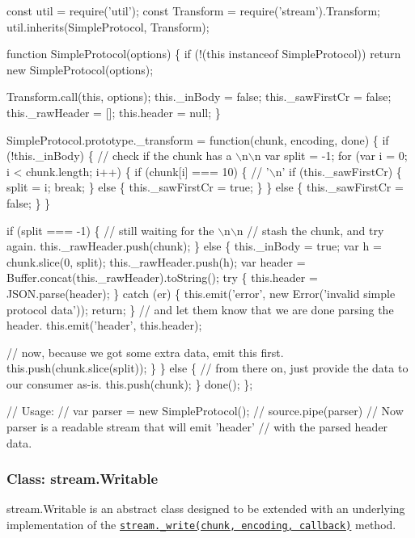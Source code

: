 \begin{DoxyCode}
const util = require('util');
const Transform = require('stream').Transform;
util.inherits(SimpleProtocol, Transform);

function SimpleProtocol(options) \{
  if (!(this instanceof SimpleProtocol))
    return new SimpleProtocol(options);

  Transform.call(this, options);
  this.\_inBody = false;
  this.\_sawFirstCr = false;
  this.\_rawHeader = [];
  this.header = null;
\}

SimpleProtocol.prototype.\_transform = function(chunk, encoding, done) \{
  if (!this.\_inBody) \{
    // check if the chunk has a \(\backslash\)n\(\backslash\)n
    var split = -1;
    for (var i = 0; i < chunk.length; i++) \{
      if (chunk[i] === 10) \{ // '\(\backslash\)n'
        if (this.\_sawFirstCr) \{
          split = i;
          break;
        \} else \{
          this.\_sawFirstCr = true;
        \}
      \} else \{
        this.\_sawFirstCr = false;
      \}
    \}

    if (split === -1) \{
      // still waiting for the \(\backslash\)n\(\backslash\)n
      // stash the chunk, and try again.
      this.\_rawHeader.push(chunk);
    \} else \{
      this.\_inBody = true;
      var h = chunk.slice(0, split);
      this.\_rawHeader.push(h);
      var header = Buffer.concat(this.\_rawHeader).toString();
      try \{
        this.header = JSON.parse(header);
      \} catch (er) \{
        this.emit('error', new Error('invalid simple protocol data'));
        return;
      \}
      // and let them know that we are done parsing the header.
      this.emit('header', this.header);

      // now, because we got some extra data, emit this first.
      this.push(chunk.slice(split));
    \}
  \} else \{
    // from there on, just provide the data to our consumer as-is.
    this.push(chunk);
  \}
  done();
\};

// Usage:
// var parser = new SimpleProtocol();
// source.pipe(parser)
// Now parser is a readable stream that will emit 'header'
// with the parsed header data.
\end{DoxyCode}


\subsubsection*{Class\+: stream.\+Writable}

{\ttfamily stream.\+Writable} is an abstract class designed to be extended with an underlying implementation of the \href{#stream_writable_write_chunk_encoding_callback_1}{\tt {\ttfamily stream.\+\_\+write(chunk, encoding, callback)}} method.


